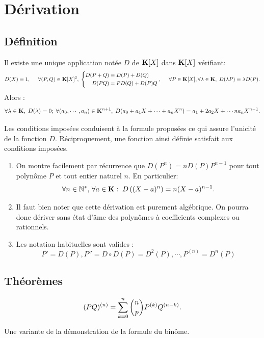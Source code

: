 \section{Dérivation}
\subsection{Définition}
\begin{propdef}
 Il existe une unique application notée $D$ de $\mathbf{K}[X]$ dans $\mathbf{K}[X]$ vérifiant:
\[
 D(X)=1, \hspace{0.5cm}
 \forall(P,Q)\in \mathbf{K}[X]^2,\;
 \left\lbrace
 \begin{aligned}
   D(P+Q) &= D(P) + D(Q)\\
   D(PQ) &= PD(Q) + D(P)Q
 \end{aligned} 
 \right.
 , \hspace{0.5cm} \forall P\in \mathbf{K}[X], \forall \lambda\in \mathbf{K},\; D(\lambda P) = \lambda D(P).
\]
Alors :
\[
\forall \lambda \in \mathbf{K}, \; D(\lambda) = 0;\; \forall(a_0,\cdots,a_n)\in \mathbf{K}^{n+1},\; D(a_0+a_1X+\cdots+a_nX^n) = a_1 +2a_2X+\cdots na_{n}X^{n-1}.
\]
\end{propdef}
\begin{demo}
Les conditions imposées conduisent à la formule proposées ce qui assure l'unicité de la fonction $D$. Réciproquement, une fonction ainsi définie satisfait aux conditions imposées.
\end{demo}
\begin{rems}
 \begin{enumerate}
  \item On montre facilement par récurrence que $D(P^n) = nD(P)P^{n-1}$ pour tout polynôme $P$ et tout entier naturel $n$. En particulier:
\[
 \forall n \in \mathbb{N}^*,\, \forall a\in \mathbf{K}:\; D\left( (X-a)^n\right) = n(X-a)^{n-1}. 
\]
  \item Il faut bien noter que cette dérivation est purement algébrique. On pourra donc dériver sans état d'âme des polynômes à coefficients complexes ou rationnels.
  \item Les notation habituelles sont valides :
\begin{displaymath}
 P'=D(P), P''=D\circ D(P)= D^2(P),\cdots, P^{(n)}=D^n(P)
\end{displaymath}
 \end{enumerate}
\end{rems}

\subsection{Théorèmes}
\begin{thm}
 \begin{displaymath}
 (PQ)^{(n)} = \sum _{k=0}^n \dbinom{n}{p} P^{(k)}Q^{(n-k)}.
\end{displaymath}
\end{thm}
\begin{demo}
 Une variante de la démonstration de la formule du binôme.
\end{demo}

